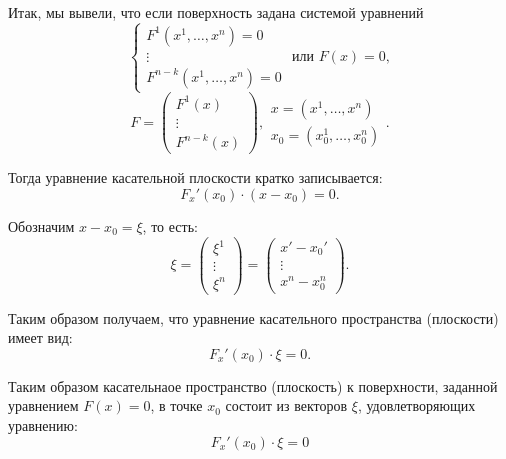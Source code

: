 \begin{note}
    Итак, мы вывели, что если поверхность задана системой уравнений
    \[
        \left\{\begin{array}{l}
            F^1(x^1,\ldots,x^n) = 0 \\
            \vdots                  \\
            F^{n-k}(x^1,\ldots,x^n) = 0
        \end{array}\right.\text{ или }F(x) = 0,
    \]
    \[
        F = \left(\begin{matrix}
                F^1(x) \\
                \vdots \\
                F^{n-k}(x)
            \end{matrix}\right), \begin{array}{l}
            x = (x^1,\ldots,x^n) \\
            x_0 = (x_0^1,\ldots,x_0^n)
        \end{array}.
    \]

    Тогда уравнение касательной плоскости кратко записывается:
    \[
        F_x'(x_0)\cdot(x-x_0) = 0.
    \]

    Обозначим $x - x_0 = \xi$, то есть:
    \[
        \xi = \left(\begin{matrix}
                \xi^1  \\
                \vdots \\
                \xi^n
            \end{matrix}\right) = \left(\begin{matrix}
                x'-x_0' \\
                \vdots  \\
                x^n-x_0^n
            \end{matrix}\right).
    \]

    Таким образом получаем, что уравнение касательного пространства (плоскости) имеет вид:
    \[
        F_x'(x_0)\cdot \xi = 0.
    \]

    Таким образом касательнаое пространство (плоскость) к поверхности, заданной уравнением $F(x) = 0$, в точке $x_0$ состоит из векторов $\xi$, удовлетворяющих уравнению:
    \begin{equation}\label{eq:11}
        F_x'(x_0)\cdot \xi = 0
    \end{equation}
\end{note}